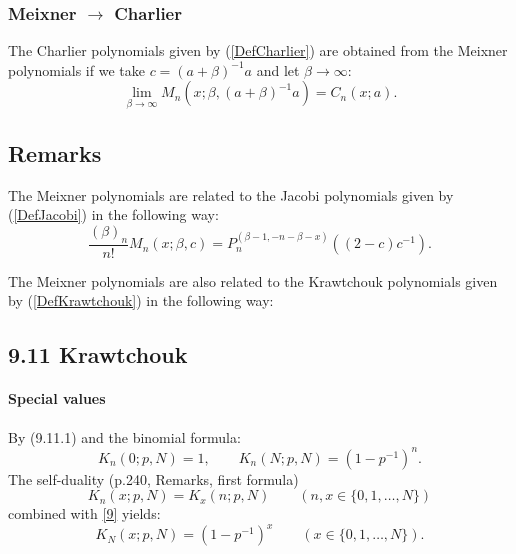 \documentclass[envcountchap,graybox]{svmono}
\newcounter{rom}
\begin{document}
\subsubsection*{Meixner $\rightarrow$ Charlier}
The Charlier polynomials given by (\ref{DefCharlier}) are obtained from the Meixner polynomials
if we take $c=(a+\beta)^{-1}a$ and let $\beta\rightarrow\infty$:
\begin{equation}
\lim_{\beta\rightarrow\infty}
M_n(x;\beta,(a+\beta)^{-1}a)=C_n(x;a).
\end{equation}

\subsection*{Remarks}
The Meixner polynomials are related to the Jacobi polynomials given by (\ref{DefJacobi})
in the following way:
$$\frac{(\beta)_n}{n!}M_n(x;\beta,c)=P_n^{(\beta-1,-n-\beta-x)}((2-c)c^{-1}).$$

\noindent
The Meixner polynomials are also related to the Krawtchouk polynomials given by
(\ref{DefKrawtchouk}) in the following way:
\subsection*{9.11 Krawtchouk}
\label{sec9.11}
%
\paragraph{Special values}
By (9.11.1) and the binomial formula:
\begin{equation}
K_n(0;p,N)=1,\qquad
K_n(N;p,N)=(1-p^{-1})^n.
\label{9}
\end{equation}
The self-duality (p.240, Remarks, first formula)
\begin{equation}
K_n(x;p,N)=K_x(n;p,N)\qquad (n,x\in \{0,1,\ldots,N\})
\label{147}
\end{equation}
combined with \eqref{9} yields:
\begin{equation}
K_N(x;p,N)=(1-p^{-1})^x\qquad(x\in\{0,1,\ldots,N\}).
\label{148}
\end{equation}
%
\end{document}
